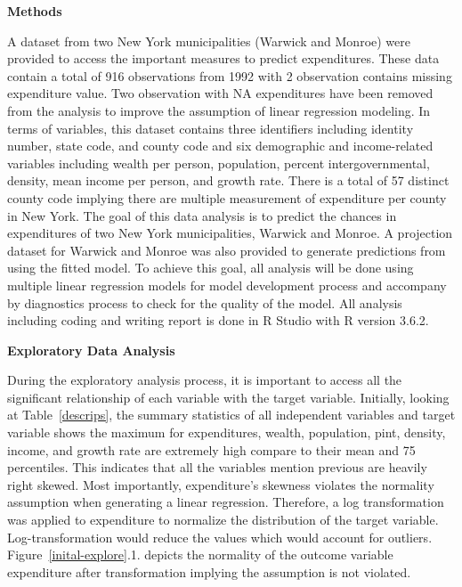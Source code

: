 \documentclass[11pt]{article}\usepackage[]{graphicx}\usepackage[]{color}
\begin{document}
\noindent\textbf{Methods} 

\noindent A dataset from two New York municipalities (Warwick and Monroe) were provided to access the important measures to predict expenditures. These data contain a total of 916 observations from 1992 with 2 observation contains missing expenditure value. Two observation with NA expenditures have been removed from the analysis to improve the assumption of linear regression modeling. In terms of variables, this dataset contains three identifiers including identity number, state code, and county code and six demographic and income-related variables including wealth per person, population, percent intergovernmental, density, mean income per person, and growth rate. There is a total of 57 distinct county code implying there are multiple measurement of expenditure per county in New York. The goal of this data analysis is to predict the chances in expenditures of two New York municipalities, Warwick and Monroe. A projection dataset for Warwick and Monroe was also provided to generate predictions from using the fitted model. To achieve this goal, all analysis will be done using multiple linear regression models for model development process and accompany by diagnostics process to check for the quality of the model. All analysis including coding and writing report is done in R Studio with R version 3.6.2.    
\hfill \break

\noindent\textbf{Exploratory Data Analysis} 

\noindent During the exploratory analysis process, it is important to access all the significant relationship of each variable with the target variable. Initially, looking at Table~\ref{descrips}, the summary statistics of all independent variables and target variable shows the maximum for expenditures, wealth, population, pint, density, income, and growth rate are extremely high compare to their mean and 75 percentiles. This indicates that all the variables mention previous are heavily right skewed. Most importantly, expenditure's skewness violates the normality assumption when generating a linear regression. Therefore, a log transformation was applied to expenditure to normalize the distribution of the target variable. Log-transformation would reduce the values which would account for outliers. Figure~\ref{inital-explore}.1. depicts the normality of the outcome variable expenditure after transformation implying the assumption is not violated.
\end{document}
